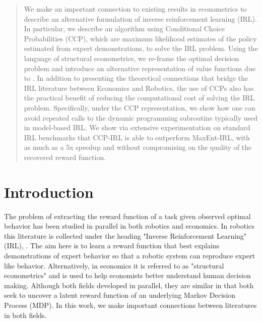 \documentclass{article}
\begin{document}
\begin{abstract}
We make an important connection to existing results in econometrics to describe an alternative formulation of inverse reinforcement learning (IRL). In particular, we describe an algorithm using Conditional Choice Probabilities (CCP), which are maximum likelihood estimates of the policy estimated from expert demonstrations, to solve the IRL problem. Using the language of structural econometrics, we re-frame the optimal decision problem and introduce an alternative representation of value functions due to \cite{hotz}. In addition to presenting the theoretical connections that bridge the IRL literature between Economics and Robotics, the use of CCPs also has the practical benefit of reducing the computational cost of solving the IRL problem. Specifically, under the CCP representation, we show how one can avoid repeated calls to the dynamic programming subroutine typically used in model-based IRL. We show via extensive experimentation on standard IRL benchmarks that CCP-IRL is able to outperform MaxEnt-IRL, with as much as a 5x speedup and without compromising on the quality of the recovered reward function.
\end{abstract} 

\section{Introduction}

The problem of extracting the reward function of a task given observed optimal behavior has been studied in parallel in both robotics and economics. In robotics this literature is collected under the heading "Inverse Reinforcement Learning" (IRL), \cite{Ng2000, abbeel2004apprenticeship}. The aim here is to learn a reward function that best explains demonstrations of expert behavior so that a robotic system can reproduce expert like behavior. Alternatively, in economics it is referred to as "structural econometrics" \cite{miller, pakes, rust_gmc} and is used to help economists better understand human decision making. Although both fields developed in parallel, they are similar in that both seek to uncover a latent reward function of an underlying Markov Decision Process (MDP). In this work, we make important connections between literatures in both fields.

\end{document}
